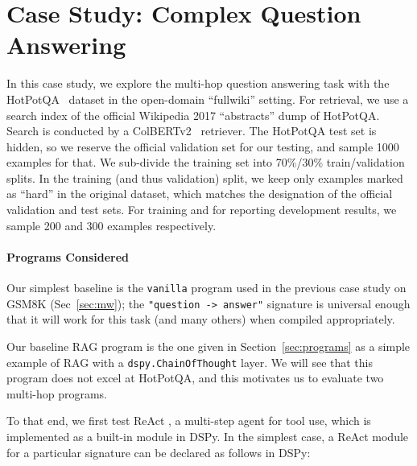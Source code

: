 

\section{Case Study: Complex Question Answering}\label{sec:qa}

In this case study, we explore the multi-hop question answering task with the HotPotQA~\citep{yang2018hotpotqa} dataset in the open-domain ``fullwiki'' setting. For retrieval, we use a search index of the official Wikipedia 2017 ``abstracts'' dump of HotPotQA. Search is conducted by a ColBERTv2~\citep{santhanam2021colbertv2} retriever. The HotPotQA test set is hidden, so we reserve the official validation set for our testing, and sample 1000 examples for that. We sub-divide the training set into 70\%/30\% train/validation splits. In the training (and thus validation) split, we keep only examples marked as ``hard'' in the original dataset, which matches the designation of the official validation and test sets. For training and for reporting development results, we sample 200 and 300 examples respectively.

\paragraph{Programs Considered}\label{sec:qa-programs}

Our simplest baseline is the \texttt{vanilla} program used in the previous case study on GSM8K (Sec~\ref{sec:mw}); the \texttt{"question -> answer"} signature is universal enough that it will work for this task (and many others) when compiled appropriately.

Our baseline RAG program is the one given in Section~\ref{sec:programs} as a simple example of RAG with a \texttt{dspy.ChainOfThought} layer. We will see that this program does not excel at HotPotQA, and this motivates us to evaluate two multi-hop programs.

To that end, we first test ReAct \citep{yao2022react}, a multi-step agent for tool use, which is implemented as a built-in module in DSPy. In the simplest case, a ReAct module for a particular signature can be declared as follows in DSPy:

